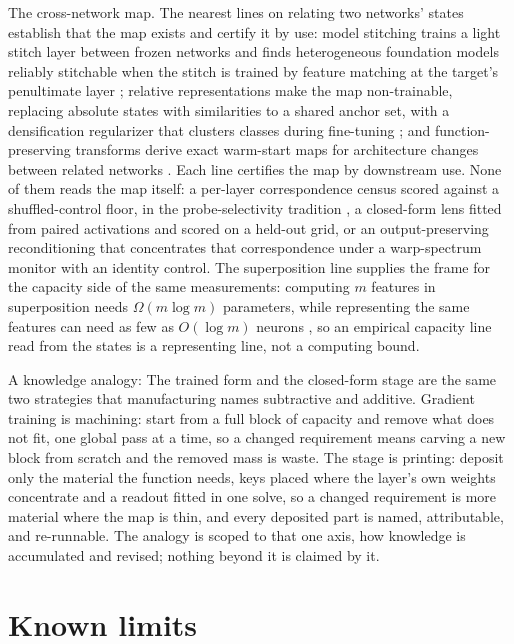 \documentclass[11pt]{article}
\begin{document}
The cross-network map. The nearest lines on relating two
networks' states establish that the map exists and certify it by
use: model stitching trains a light stitch layer between frozen
networks and finds heterogeneous foundation models reliably
stitchable when the stitch is trained by feature matching at the
target's penultimate layer \cite{stitch2026}; relative
representations make the map non-trainable, replacing absolute
states with similarities to a shared anchor set, with a
densification regularizer that clusters classes during fine-tuning
\cite{moschella2022,relgeom2024}; and function-preserving
transforms derive exact warm-start maps for architecture changes
between related networks \cite{fpt2024}. Each line certifies the
map by downstream use. None of them reads the map itself: a
per-layer correspondence census scored against a shuffled-control
floor, in the probe-selectivity tradition \cite{hewitt2019}, a
closed-form lens fitted from paired activations and scored on a
held-out grid, or an output-preserving reconditioning that
concentrates that correspondence under a warp-spectrum monitor
with an identity control. The superposition line supplies the
frame for the capacity side of the same measurements: computing
$m$ features in superposition needs $\Omega(m\log m)$ parameters,
while representing the same features can need as few as
$O(\log m)$ neurons \cite{superpos2024}, so an empirical capacity
line read from the states is a representing line, not a computing
bound.

A knowledge analogy: The trained form and the closed-form stage
are the same two strategies that manufacturing names subtractive
and additive. Gradient training is machining: start from a full
block of capacity and remove what does not fit, one global pass
at a time, so a changed requirement means carving a new block from
scratch and the removed mass is waste. The stage is printing:
deposit only the material the function needs, keys placed where
the layer's own weights concentrate and a readout fitted in one
solve, so a changed requirement is more material where the map is
thin, and every deposited part is named, attributable, and
re-runnable. The analogy is scoped to that one axis, how
knowledge is accumulated and revised; nothing beyond it is
claimed by it.

\section{Known limits}
\end{document}
